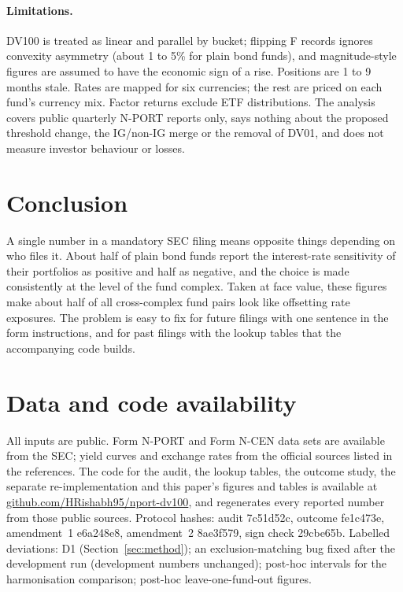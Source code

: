 \documentclass[11pt]{article}
\begin{document}
\paragraph{Limitations.} DV100 is treated as linear and parallel by bucket; flipping F records ignores
convexity asymmetry (about 1 to 5\% for plain bond funds), and magnitude-style figures are assumed to
have the economic sign of a rise. Positions are 1 to 9 months stale. Rates are mapped for six
currencies; the rest are priced on each fund's currency mix. Factor returns exclude ETF distributions.
The analysis covers public quarterly N-PORT reports only, says nothing about the proposed threshold
change, the IG/non-IG merge or the removal of DV01, and does not measure investor behaviour or losses.

\section{Conclusion}

A single number in a mandatory SEC filing means opposite things depending on who files it. About half
of plain bond funds report the interest-rate sensitivity of their portfolios as positive and half as
negative, and the choice is made consistently at the level of the fund complex. Taken at face value,
these figures make about half of all cross-complex fund pairs look like offsetting rate exposures.
The problem is easy to fix for future filings with one sentence in the form instructions, and for
past filings with the lookup tables that the accompanying code builds.

\section*{Data and code availability}
All inputs are public. Form N-PORT and Form N-CEN data sets are available from the SEC; yield curves and
exchange rates from the official sources listed in the references. The code for the audit, the lookup
tables, the outcome study, the separate re-implementation and this paper's figures and tables is
available at \href{https://github.com/HRishabh95/nport-dv100}{github.com/HRishabh95/nport-dv100}, and regenerates every
reported number from those public sources. Protocol hashes: audit 7c51d52c, outcome fe1c473e,
amendment~1 e6a248e8, amendment~2 8ae3f579, sign check 29cbe65b. Labelled deviations: D1
(Section~\ref{sec:method}); an exclusion-matching bug fixed after the development run (development
numbers unchanged); post-hoc intervals for the harmonisation comparison; post-hoc leave-one-fund-out
figures.
\end{document}
